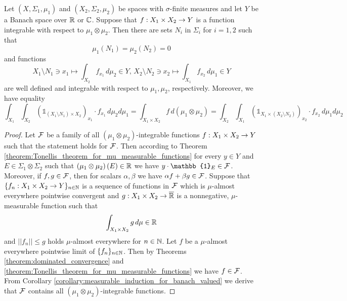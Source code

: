 \begin{theorem}\label{corollary:fubinis_for_integrable}
Let $(X,\Sigma_1,\mu_1)$ and $(X_2,\Sigma_2,\mu_2)$ be spaces with $\sigma$-finite measures and let $Y$ be a Banach space over ${\mathbb R}$ or ${\mathbb C}$. Suppose that $f:X_1\times X_2\rightarrow Y$ is a function integrable with respect to $\mu_1\otimes \mu_2$. Then there are sets $N_i$ in $\Sigma_i$ for $i=1,2$ such that
$$\mu_1(N_1) = \mu_2(N_2) = 0$$ 
and functions
$$X_1\setminus N_1\ni x_1\mapsto \int_{X_2}f_{x_1}\,d\mu_2\in Y,\,X_2\setminus N_2\ni x_2\mapsto \int_{X_1}f_{x_2}\,d\mu_1\in Y$$
are well defined and integrable with respect to $\mu_1, \mu_2$, respectively. Moreover, we have equality
$$\int_{X_1}\int_{X_2} \left(\mathbb{1}_{\left(X_1\setminus N_1\right)\times X_2}\right)_{x_1}\cdot f_{x_1}\,d\mu_2d\mu_1 = \int_{X_1\times X_2}f\,d(\mu_1\otimes \mu_2) = \int_{X_2}\int_{X_1} \left(\mathbb{1}_{X_1\times \left(X_2\setminus N_2\right)}\right)_{x_2}\cdot f_{x_2}\,d\mu_1d\mu_2$$
\end{theorem}
\begin{proof}
Let ${\mathcal F}$ be a family of all $\left(\mu_1\otimes \mu_2\right)$-integrable functions $f:X_1\times X_2\rightarrow Y$ such that the statement holds for ${\mathcal F}$. Then according to Theorem \ref{theorem:Tonellis_theorem_for_mu_measurable_functions} for every $y\in Y$ and $E\in \Sigma_1\otimes \Sigma_2$ such that $\left(\mu_1\otimes \mu_2\right)(E) \in {\mathbb R}$ we have $y\cdot \mathbb{1}_E \in \cF$. Moreover, if $f, g\in {\mathcal F}$, then for scalars $\alpha,\beta$ we have $\alpha f + \beta g\in {\mathcal F}$. Suppose that $\{f_n:X_1\times X_2\rightarrow Y\}_{n\in {\mathbb N}}$ is a sequence of functions in ${\mathcal F}$ which is $\mu$-almost everywhere pointwise convergent and $g:X_1\times X_2\rightarrow \overline{{\mathbb R}}$ is a nonnegative, $\mu$-measurable function such that
$$\int_{X_1\times X_2}g\,d\mu \in {\mathbb R}$$
and $||f_n||\leq g$ holds $\mu$-almost everywhere for $n\in {\mathbb N}$. Let $f$ be a $\mu$-almost everywhere pointwise limit of $\{f_n\}_{n\in {\mathbb N}}$. Then by Theorems \ref{theorem:dominated_convergence} and \ref{theorem:Tonellis_theorem_for_mu_measurable_functions} we have $f\in {\mathcal F}$. From Corollary \ref{corollary:measurable_induction_for_banach_valued} we derive that ${\mathcal F}$ contains all $\left(\mu_1\otimes \mu_2\right)$-integrable functions.
\end{proof}










\small



